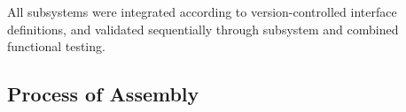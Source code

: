 \noindent All subsystems were integrated according to version-controlled interface definitions, and validated sequentially through subsystem and combined functional testing.



\pagebreak


\pagebreak


\pagebreak

\subsection{Process of Assembly}

